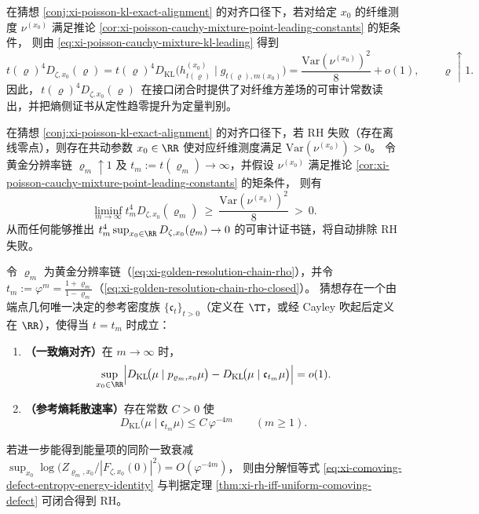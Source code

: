 \begin{remark}\label{rem:xi-poisson-kl-normalized-defect-readout}
在猜想 \ref{conj:xi-poisson-kl-exact-alignment} 的对齐口径下，若对给定 \(x_0\) 的纤维测度 \(\nu^{(x_0)}\) 满足推论 \ref{cor:xi-poisson-cauchy-mixture-point-leading-constants} 的矩条件，
则由 \eqref{eq:xi-poisson-cauchy-mixture-kl-leading} 得到
\[
t(\varrho)^4D_{\zeta,x_0}(\varrho)
=t(\varrho)^4D_{\mathrm{KL}}\!\bigl(h^{(x_0)}_{t(\varrho)}\mid g_{t(\varrho),m(x_0)}\bigr)
=\frac{\mathrm{Var}(\nu^{(x_0)})^2}{8}+o(1),
\qquad \varrho\uparrow 1.
\]
因此，\(\,t(\varrho)^4D_{\zeta,x_0}(\varrho)\,\) 在接口闭合时提供了对纤维方差场的可审计常数读出，并把熵侧证书从定性趋零提升为定量判别。
\end{remark}

\begin{conjecture}\label{conj:xi-rh-failure-entropy-gap}
在猜想 \ref{conj:xi-poisson-kl-exact-alignment} 的对齐口径下，若 RH 失败（存在离线零点），则存在共动参数 \(x_0\in\RR\) 使对应纤维测度满足 \(\mathrm{Var}(\nu^{(x_0)})>0\)。
令黄金分辨率链 \(\varrho_m\uparrow 1\) 及 \(t_m:=t(\varrho_m)\to\infty\)，并假设 \(\nu^{(x_0)}\) 满足推论 \ref{cor:xi-poisson-cauchy-mixture-point-leading-constants} 的矩条件，
则有
\[
\liminf_{m\to\infty} t_m^4D_{\zeta,x_0}(\varrho_m)\ \ge\ \frac{\mathrm{Var}(\nu^{(x_0)})^2}{8}\ >\ 0.
\]
从而任何能够推出 \(t_m^4\sup_{x_0\in\RR}D_{\zeta,x_0}(\varrho_m)\to 0\) 的可审计证书链，将自动排除 RH 失败。
\end{conjecture}

\begin{conjecture}[黄金尺度下的熵刚性与端点基准流]\label{conj:xi-horizon-entropy-rigidity-golden-reference}
令 \(\varrho_m\) 为黄金分辨率链（\eqref{eq:xi-golden-resolution-chain-rho}），并令 \(t_m:=\varphi^m=\frac{1+\varrho_m}{1-\varrho_m}\)（\eqref{eq:xi-golden-resolution-chain-rho-closed}）。
猜想存在一个由端点几何唯一决定的参考密度族 \(\{\mathfrak{c}_t\}_{t>0}\)（定义在 \(\TT\)，或经 Cayley 吹起后定义在 \(\RR\)），使得当 \(t=t_m\) 时成立：
\begin{enumerate}
  \item \textbf{（一致熵对齐）}在 \(m\to\infty\) 时，
  \[
  \sup_{x_0\in\RR}\Bigl|D_{\mathrm{KL}}\!\bigl(\mu\mid p_{\varrho_m,x_0}\mu\bigr)-D_{\mathrm{KL}}\!\bigl(\mu\mid \mathfrak{c}_{t_m}\mu\bigr)\Bigr|
  =o(1).
  \]
  \item \textbf{（参考熵耗散速率）}存在常数 \(C>0\) 使
  \[
  D_{\mathrm{KL}}\!\bigl(\mu\mid \mathfrak{c}_{t_m}\mu\bigr)\le C\,\varphi^{-4m}\qquad(m\ge 1).
  \]
\end{enumerate}
若进一步能得到能量项的同阶一致衰减
\(
\sup_{x_0}\log\!\bigl(Z_{\varrho_m,x_0}/|F_{\zeta,x_0}(0)|^2\bigr)=O(\varphi^{-4m})
\)，
则由分解恒等式 \eqref{eq:xi-comoving-defect-entropy-energy-identity} 与判据定理 \ref{thm:xi-rh-iff-uniform-comoving-defect} 可闭合得到 RH。
\end{conjecture}

\endinput
